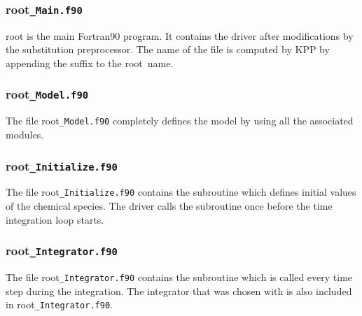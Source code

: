 \documentclass[twoside]{article}
\newcommand{\kpproot}{{\sc root}}
\begin{document}
\subsubsection{\kpproot{\tt\_Main.f90}}
\label{sec:output-main}

\kpproot{} is the main Fortran90 program. It contains the
driver after modifications by the substitution preprocessor. The name of
the file is computed by KPP by appending the suffix 
to the \kpproot\ name.

\subsubsection{\kpproot{\tt\_Model.f90}}
\label{sec:output-model}

The file \kpproot{\tt\_Model.f90} completely defines the model by using
all the associated modules.

\subsubsection{\kpproot{\tt\_Initialize.f90}}
\label{sec:output-init}

The file \kpproot{\tt\_Initialize.f90} contains the subroutine 
which defines initial values of the chemical species. The driver calls
the subroutine  once before the time integration loop
starts.

\subsubsection{\kpproot{\tt\_Integrator.f90}}
\label{sec:output-integrator}

The file \kpproot{\tt\_Integrator.f90} contains the subroutine
 which is called every time step during the integration.
The integrator that was chosen with  is also included
in \kpproot{\tt\_Integrator.f90}.
\end{document}
